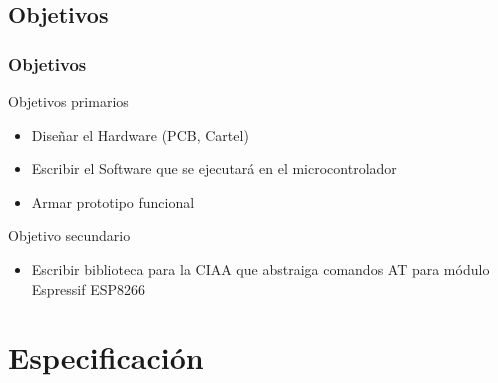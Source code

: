 \subsection{Objetivos}
\begin{frame}
	\frametitle{Objetivos}
	\begin{block}{Objetivos primarios}
		\begin{itemize}
			\item Diseñar el Hardware (PCB, Cartel)
			\item Escribir el Software que se ejecutará en el microcontrolador
			\item Armar prototipo funcional
		\end{itemize}
	\end{block}
	
	\begin{block}{Objetivo secundario}
		\begin{itemize}
			\item Escribir biblioteca para la CIAA que abstraiga comandos AT para módulo Espressif ESP8266
		\end{itemize}
	\end{block}
\end{frame}

\section{Especificación}

